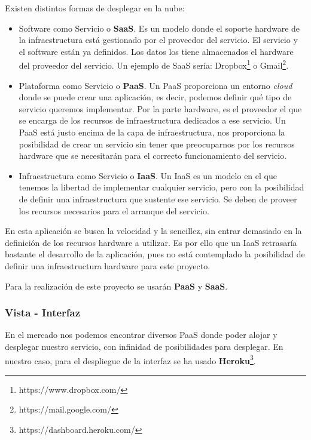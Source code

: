 Existen distintos formas de desplegar en la nube\cite{cloud}\cite{cloud2}\cite{cloud3}\cite{cloud4}:

\begin{itemize}
    \item Software como Servicio o \textbf{SaaS}. Es un modelo donde el soporte hardware de la infraestructura está gestionado por el proveedor del servicio. El servicio y el software están ya definidos. Los datos los tiene almacenados el  hardware del proveedor del servicio. Un ejemplo de SaaS sería: Dropbox\footnote{https://www.dropbox.com/} o Gmail\footnote{https://mail.google.com/}.
    \item Plataforma como Servicio o \textbf{PaaS}. Un PaaS proporciona un entorno \textit{cloud} donde se puede crear una aplicación, es decir, podemos definir qué tipo de servicio queremos implementar. Por la parte hardware, es el proveedor el que se encarga de los recursos de infraestructura dedicados a ese servicio. Un PaaS está justo encima de la capa de infraestructura, nos proporciona la posibilidad de crear un servicio sin tener que preocuparnos por los recursos hardware que se necesitarán para el correcto funcionamiento del servicio.
    \item Infraestructura como Servicio o \textbf{IaaS}. Un IaaS es un modelo en el que tenemos la libertad de implementar cualquier servicio, pero con la posibilidad de definir una infraestructura que sustente ese servicio. Se deben de proveer los recursos necesarios para el arranque del servicio.
\end{itemize}

En esta aplicación se busca la velocidad y la sencillez, sin entrar demasiado en la definición de los recursos hardware a utilizar. Es por ello que un IaaS retrasaría bastante el desarrollo de la aplicación, pues no está contemplado la posibilidad de definir una infraestructura hardware para este proyecto.

Para la realización de este proyecto se usarán \textbf{PaaS} y \textbf{SaaS}.

\subsubsection{Vista - Interfaz}

En el mercado nos podemos encontrar diversos PaaS donde poder alojar y desplegar nuestro servicio, con infinidad de posibilidades para desplegar. En nuestro caso, para  el despliegue de la interfaz se ha usado \textbf{Heroku}\footnote{https://dashboard.heroku.com/}.

